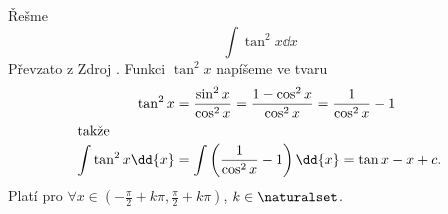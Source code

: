 \begin{mdframed}[style=mdexam]
  \begin{example}\label{MAI:exam127}
    Řešme 
    \begin{equation}\label{MA:int_ex_06}
      \int{\tan^2x}\dd{x}
    \end{equation}
    Převzato z Zdroj \cite[s.~30]{Knichal}. Funkci \(\tan^2x\) napíšeme ve tvaru 
    \begin{align*}
      \tan^2x &= \frac{\sin^2x}{\cos^2x}=\frac{1-\cos^2x}{\cos^2x} = \frac{1}{\cos^2x}-1   \\
      \shortintertext{takže}
      \int{\tan^2x}\dd{x} &= \int\left(\frac{1}{\cos^2x}-1\right)\dd{x} = \tan x - x + c.  
    \end{align*}  
    Platí pro \(\forall x\in\left(-\frac{\pi}{2}+k\pi, \frac{\pi}{2}+k\pi\right)\),
    \(k\in\naturalset\).
  \end{example}
\end{mdframed}
